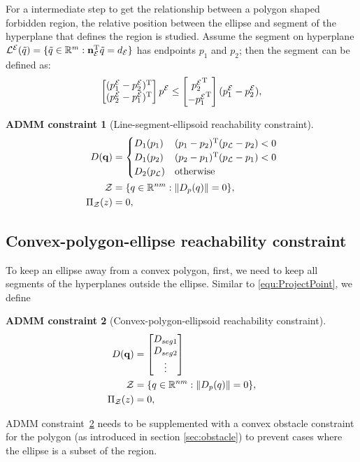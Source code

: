 \documentclass[journal]{IEEEtran}  %
\newtheorem{constraint}{ADMM constraint}
\def\sZ{\mathcal{Z}}
\begin{document}
For a intermediate step to get the relationship between a polygon shaped forbidden region, the relative position between the ellipse and segment of the hyperplane that defines the region is studied. 
Assume the segment on hyperplane ${\mathcal{L}^{\mathcal{E}}}(\tilde{q}) = \{  \tilde{q}\in\mathbb{R}^m:  \mathbf{n}_{\mathcal{E}}^\mathrm{T} \tilde{q} = d_{\mathcal{E}}\}$ has endpoints $p_1$ and $p_2$; then the segment can be defined as:
\begin{equation}
\begin{bmatrix}({p_1^{\mathcal{E}}}- {p_2^{\mathcal{E}}})^\mathrm{T}\\( {p_2^{\mathcal{E}}} - {p_1^{\mathcal{E}}})^\mathrm{T}\end{bmatrix}  {p^{\mathcal{E}}} \leq \begin{bmatrix} {p_2^{\mathcal{E}}}^\mathrm{T}\\- {p_1^{\mathcal{E}}}^\mathrm{T}\end{bmatrix}( {p_1^{\mathcal{E}}}- {p_2^{\mathcal{E}}}), 
\end{equation}
\begin{constraint}[Line-segment-ellipsoid reachability constraint]
\begin{align}
D(\vq) &=  \begin{cases}
D_1(p_1) & (p_1-p_2)\transpose (p_{\cL}-p_2)<0\\
D_1(p_2) & (p_2-p_1)\transpose (p_{\cL}-p_1)<0\\
D_2(p_{\cL}) & \textrm{otherwise}
\end{cases} \label{eq:segment_ellipsoid_constraint}\\
  \sZ &= \{q\in\mathbb{R}^{nm}:\norm{D_p(q)} = 0 \},\\
   \Pi_\sZ(z) & = 0, 
\end{align}
\end{constraint}

\subsection{Convex-polygon-ellipse reachability constraint}\label{sec:ellipse-region-constraint} 
To keep an ellipse away from a convex polygon, first, we need to keep all segments of the hyperplanes outside the ellipse. Similar to \eqref{equ:ProjectPoint}, we define
\begin{constraint}[Convex-polygon-ellipsoid reachability constraint]\label{constraint:polygon-ellipsoid}
\begin{align}
D(\vq) &= \bmat{D_{seg1}\\D_{seg2}\\ \vdots} \label{eq:region_ellipsoid_constraint}\\
  \sZ &= \{q\in\mathbb{R}^{nm}:\norm{D_p(q)} = 0 \},\\
   \Pi_\sZ(z) & = 0, 
\end{align}
\end{constraint}
ADMM constraint~\ref{constraint:polygon-ellipsoid} needs to be supplemented with a convex obstacle constraint for the polygon (as introduced in section \ref{sec:obstacle}) to prevent cases where the ellipse is a subset of the region.
\end{document}
